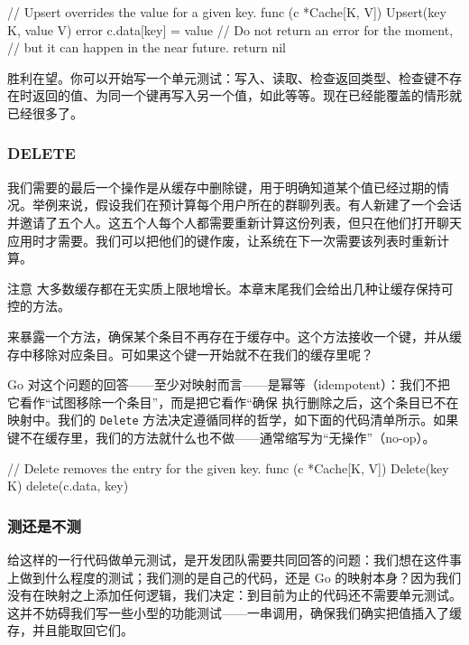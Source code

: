 \begin{gocode}[title={代码清单 7.4 \texttt{cache.go}：在缓存上实现 \texttt{Upsert} 函数}]
// Upsert overrides the value for a given key.
func (c *Cache[K, V]) Upsert(key K, value V) error {
    c.data[key] = value
    // Do not return an error for the moment,
    // but it can happen in the near future.
    return nil
}
\end{gocode}

胜利在望。你可以开始写一个单元测试：写入、读取、检查返回类型、检查键不存在时返回的值、为同一个键再写入另一个值，如此等等。现在已经能覆盖的情形就已经很多了。

\subsubsection*{DELETE}

我们需要的最后一个操作是从缓存中删除键，用于明确知道某个值已经过期的情况。举例来说，假设我们在预计算每个用户所在的群聊列表。有人新建了一个会话并邀请了五个人。这五个人每个人都需要重新计算这份列表，但只在他们打开聊天应用时才需要。我们可以把他们的键作废，让系统在下一次需要该列表时重新计算。

\begin{infobox}{注意}
大多数缓存都在无实质上限地增长。本章末尾我们会给出几种让缓存保持可控的方法。
\end{infobox}

来暴露一个方法，确保某个条目不再存在于缓存中。这个方法接收一个键，并从缓存中移除对应条目。可如果这个键一开始就不在我们的缓存里呢？

Go 对这个问题的回答——至少对映射而言——是幂等（idempotent）：我们不把它看作``试图移除一个条目''，而是把它看作``确保
执行删除之后，这个条目已不在映射中。我们的 \texttt{Delete} 方法决定遵循同样的哲学，如下面的代码清单所示。如果键不在缓存里，我们的方法就什么也不做——通常缩写为``无操作''（no-op）。

\begin{gocode}[title={代码清单 7.5 \texttt{cache.go}：在缓存上实现 \texttt{Delete} 方法}]
// Delete removes the entry for the given key.
func (c *Cache[K, V]) Delete(key K) {
    delete(c.data, key)
}
\end{gocode}

\subsubsection*{测还是不测}

给这样的一行代码做单元测试，是开发团队需要共同回答的问题：我们想在这件事上做到什么程度的测试；我们测的是自己的代码，还是 Go 的映射本身？因为我们没有在映射之上添加任何逻辑，我们决定：到目前为止的代码还不需要单元测试。这并不妨碍我们写一些小型的功能测试——一串调用，确保我们确实把值插入了缓存，并且能取回它们。

